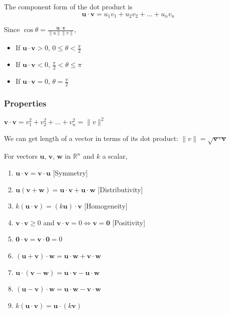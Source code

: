 \documentclass[../linear-algebra.tex]{subfiles}
\begin{document}
\noindent The component form of the dot product is
\[\mathbf{u} \cdot \mathbf{v} = u_1v_1 + u_2v_2 + \ldots + u_nv_n\]

\noindent Since $\cos\theta = \frac{\mathbf{u} \cdot \mathbf{v}}{\|u\|\|v\|}$,
\begin{itemize}
    \item If $\mathbf{u} \cdot \mathbf{v} > 0$, $0 \leq \theta < \frac{\pi}{2}$
    \item If $\mathbf{u} \cdot \mathbf{v} < 0$, $\frac{\pi}{2} < \theta \leq \pi$
    \item If $\mathbf{u} \cdot \mathbf{v} = 0$, $\theta = \frac{\pi}{2}$
\end{itemize}

\subsubsection{Properties}

$\mathbf{v} \cdot \mathbf{v} = v_1^2 + v_2^2 + \ldots + v_n^2 = \|v\|^2$

\medskip

\noindent We can get length of a vector in terms of its dot product: $\|v\| = \sqrt{\mathbf{v}\cdot\mathbf{v}}$

\medskip

\noindent For vectors $\mathbf{u}$, $\mathbf{v}$, $\mathbf{w}$ in $\mathbb{R}^n$ and $k$ a scalar,
\begin{enumerate}
    \item $\mathbf{u} \cdot \mathbf{v} = \mathbf{v} \cdot \mathbf{u}$ [Symmetry]
    \item $\mathbf{u}(\mathbf{v} + \mathbf{w}) = \mathbf{u} \cdot \mathbf{v} + \mathbf{u} \cdot \mathbf{w}$ [Distributivity]
    \item $k(\mathbf{u} \cdot \mathbf{v}) = (k\mathbf{u})\cdot\mathbf{v}$ [Homogeneity]
    \item $\mathbf{v}\cdot\mathbf{v} \geq 0$ and $\mathbf{v}\cdot\mathbf{v} = 0 \iff \mathbf{v} = \mathbf{0}$ [Positivity]
    \item $\mathbf{0}\cdot\mathbf{v} = \mathbf{v}\cdot\mathbf{0} = 0$
    \item $(\mathbf{u} + \mathbf{v})\cdot\mathbf{w} = \mathbf{u}\cdot\mathbf{w} + \mathbf{v}\cdot\mathbf{w}$
    \item $\mathbf{u}\cdot(\mathbf{v} - \mathbf{w}) = \mathbf{u}\cdot\mathbf{v} - \mathbf{u}\cdot\mathbf{w}$
    \item $(\mathbf{u} - \mathbf{v}) \cdot \mathbf{w} = \mathbf{u} \cdot \mathbf{w} - \mathbf{v} \cdot \mathbf{w}$
    \item $k(\mathbf{u} \cdot \mathbf{v}) = \mathbf{u} \cdot (k\mathbf{v})$
\end{enumerate}
\end{document}
